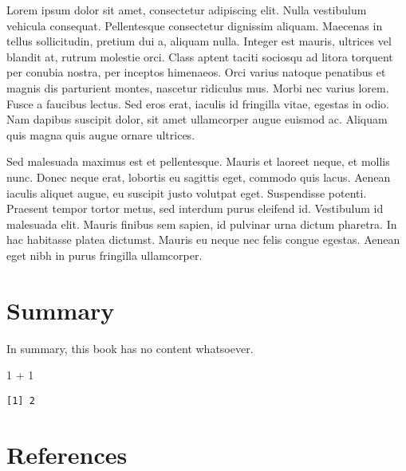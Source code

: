 \documentclass[
  12pt,
  letterpaper,
  oneside,
  open=any]{scrbook}
\newenvironment{Shaded}{\begin{snugshade}}{\end{snugshade}}
\newcommand{\DecValTok}[1]{\textcolor[rgb]{0.68,0.00,0.00}{#1}}
\newcommand{\SpecialCharTok}[1]{\textcolor[rgb]{0.37,0.37,0.37}{#1}}
\begin{document}
Lorem ipsum dolor sit amet, consectetur adipiscing elit. Nulla
vestibulum vehicula consequat. Pellentesque consectetur dignissim
aliquam. Maecenas in tellus sollicitudin, pretium dui a, aliquam nulla.
Integer est mauris, ultrices vel blandit at, rutrum molestie orci. Class
aptent taciti sociosqu ad litora torquent per conubia nostra, per
inceptos himenaeos. Orci varius natoque penatibus et magnis dis
parturient montes, nascetur ridiculus mus. Morbi nec varius lorem. Fusce
a faucibus lectus. Sed eros erat, iaculis id fringilla vitae, egestas in
odio. Nam dapibus suscipit dolor, sit amet ullamcorper augue euismod ac.
Aliquam quis magna quis augue ornare ultrices.

Sed malesuada maximus est et pellentesque. Mauris et laoreet neque, et
mollis nunc. Donec neque erat, lobortis eu sagittis eget, commodo quis
lacus. Aenean iaculis aliquet augue, eu suscipit justo volutpat eget.
Suspendisse potenti. Praesent tempor tortor metus, sed interdum purus
eleifend id. Vestibulum id malesuada elit. Mauris finibus sem sapien, id
pulvinar urna dictum pharetra. In hac habitasse platea dictumst. Mauris
eu neque nec felis congue egestas. Aenean eget nibh in purus fringilla
ullamcorper.


\hypertarget{summary}{%
\chapter{Summary}\label{summary}}

In summary, this book has no content whatsoever.

\begin{Shaded}
\begin{Highlighting}[]
\DecValTok{1} \SpecialCharTok{+} \DecValTok{1}
\end{Highlighting}
\end{Shaded}

\begin{verbatim}
[1] 2
\end{verbatim}


\hypertarget{references}{%
\chapter*{References}\label{references}}

\end{document}
